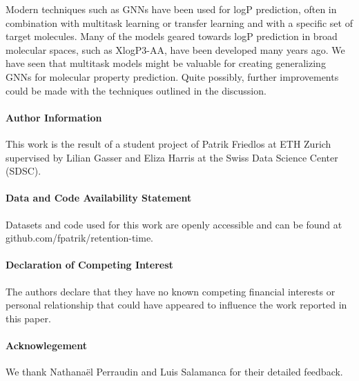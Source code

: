 \documentclass{article}
\begin{document}
Modern techniques such as GNNs have been used for logP prediction, often in combination with multitask learning or transfer learning and with a specific set of target molecules. Many of the models geared towards logP prediction in broad molecular spaces, such as XlogP3-AA, have been developed many years ago. We have seen that multitask models might be valuable for creating generalizing GNNs for molecular property prediction. Quite possibly, further improvements could be made with the techniques outlined in the discussion.

\paragraph{Author Information\\}

This work is the result of a student project of Patrik Friedlos at ETH Zurich supervised by Lilian Gasser and Eliza Harris at the Swiss Data Science Center (SDSC).

\paragraph{Data and Code Availability Statement\\}

Datasets and code used for this work are openly accessible and can be found at github.com/fpatrik/retention-time.

\paragraph{Declaration of Competing Interest\\}

The authors declare that they have no known competing financial interests or personal relationship that could have appeared to influence the work reported in this paper.

\paragraph{Acknowlegement\\}

We thank Nathanaël Perraudin and Luis Salamanca for their detailed feedback.

 

\end{document}
